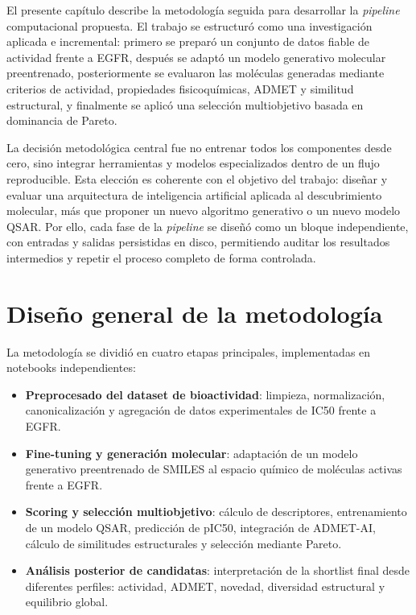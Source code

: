 \documentclass[IB]{TFUOC}%
\begin{document}
El presente capítulo describe la metodología seguida para desarrollar la \textit{pipeline} computacional propuesta. El trabajo se estructuró como una investigación aplicada e incremental: primero se preparó un conjunto de datos fiable de actividad frente a EGFR, después se adaptó un modelo generativo molecular preentrenado, posteriormente se evaluaron las moléculas generadas mediante criterios de actividad, propiedades fisicoquímicas, ADMET y similitud estructural, y finalmente se aplicó una selección multiobjetivo basada en dominancia de Pareto.

La decisión metodológica central fue no entrenar todos los componentes desde cero, sino integrar herramientas y modelos especializados dentro de un flujo reproducible. Esta elección es coherente con el objetivo del trabajo: diseñar y evaluar una arquitectura de inteligencia artificial aplicada al descubrimiento molecular, más que proponer un nuevo algoritmo generativo o un nuevo modelo QSAR. Por ello, cada fase de la \textit{pipeline} se diseñó como un bloque independiente, con entradas y salidas persistidas en disco, permitiendo auditar los resultados intermedios y repetir el proceso completo de forma controlada.

\section{Diseño general de la metodología}

La metodología se dividió en cuatro etapas principales, implementadas en notebooks independientes:

\begin{itemize}
    \item \textbf{Preprocesado del dataset de bioactividad}: limpieza, normalización, canonicalización y agregación de datos experimentales de IC50 frente a EGFR.
    \item \textbf{Fine-tuning y generación molecular}: adaptación de un modelo generativo preentrenado de SMILES al espacio químico de moléculas activas frente a EGFR.
    \item \textbf{Scoring y selección multiobjetivo}: cálculo de descriptores, entrenamiento de un modelo QSAR, predicción de pIC50, integración de ADMET-AI, cálculo de similitudes estructurales y selección mediante Pareto.
    \item \textbf{Análisis posterior de candidatas}: interpretación de la shortlist final desde diferentes perfiles: actividad, ADMET, novedad, diversidad estructural y equilibrio global.
\end{itemize}
\end{document}
